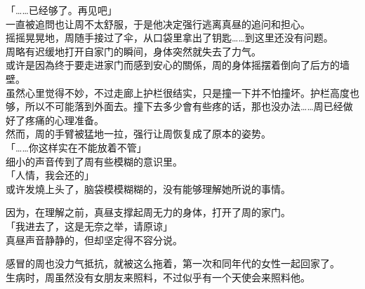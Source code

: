 「……已经够了。再见吧」\\

一直被追問也让周不太舒服，于是他决定强行逃离真昼的追问和担心。\\

摇摇晃晃地，周随手接过了伞，从口袋里拿出了钥匙……到这里还没有问题。\\

周略有迟缓地打开自家门的瞬间，身体突然就失去了力气。\\

或许是因為终于要走进家门而感到安心的關係，周的身体摇摆着倒向了后方的墙壁。\\

虽然心里觉得不妙，不过走廊上护栏很结实，只是撞一下并不怕撞坏。护栏高度也够，所以不可能落到外面去。撞下去多少會有些疼的话，那也没办法……周已经做好了疼痛的心理准备。\\

然而，周的手臂被猛地一拉，强行让周恢复成了原本的姿势。\\

「……你这样实在不能放着不管」\\

细小的声音传到了周有些模糊的意识里。\\

「人情，我会还的」\\

或许发燒上头了，脑袋模模糊糊的，没有能够理解她所说的事情。

因为，在理解之前，真昼支撑起周无力的身体，打开了周的家门。\\

「我进去了，这是无奈之举，请原谅」\\

真昼声音静静的，但却坚定得不容分说。

感冒的周也没力气抵抗，就被这么拖着，第一次和同年代的女性一起回家了。\\

生病时，周虽然没有女朋友来照料，不过似乎有一个天使会来照料他。
